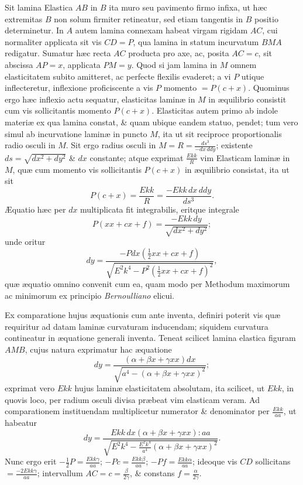 Sit lamina Elastica $AB$ in $B$ ita muro seu pavimento firmo infixa, ut hæc extremitas $B$ non solum firmiter retineatur, sed etiam tangentis in $B$ positio determinetur. In $A$ autem lamina connexam habeat virgam rigidam $AC$, cui normaliter applicata sit vis $CD=P$, qua lamina in statum incurvatum $BMA$ redigatur. Sumatur hæc recta $AC$ producta pro axe, ac, posita $AC=c$, sit abscissa $AP=x$, applicata $PM=y$. Quod si jam lamina in $M$ omnem elasticitatem subito amitteret, ac perfecte flexilis evaderet; a vi $P$ utique inflecteretur, inflexione proficiscente a vis $P$ momento $=P(c+x)$. Quominus ergo hæc inflexio actu sequatur, elasticitas laminæ in $M$ in æquilibrio consistit cum vis sollicitantis momento $P(c+x)$. Elasticitas autem primo ab indole materiæ ex qua lamina constat, \& quam ubique eandem statuo, pendet; tum vero simul ab incurvatione laminæ in puncto $M$, ita ut sit reciproce proportionalis radio osculi in $M$. Sit ergo radius osculi in $M=R=\frac{ds^3}{-dx\,ddy}$; existente $ds=\sqrt{dx^2+dy^2}$ \& $dx$ constante; atque exprimat $\frac{Ekk}{R}$ vim Elasticam laminæ in $M$, quæ cum momento vis sollicitantis $P(c+x)$ in æquilibrio consistat, ita ut sit
\[P(c+x)=\frac{Ekk}{R}=\frac{-Ekk\,dx\,ddy}{ds^3}.\]
Æquatio hæc
per $dx$ multiplicata fit integrabilis, eritque integrale
\[P(xx+cx+f)=\frac{-Ekk\,dy}{\sqrt{dx^2+dy^2}};\]
unde oritur
\[dy=\frac{-Pdx(\frac12xx+cx+f)}{\sqrt{E^2k^4-P^2(\frac12xx+cx+f)^2}},\]
quæ æquatio omnino convenit cum ea, quam modo per Methodum maximorum ac minimorum ex principio \textit{Bernoulliano} elicui.

Ex comparatione hujus æquationis cum ante inventa, definiri poterit vis quæ requiritur ad datam laminæ curvaturam inducendam; siquidem curvatura contineatur in æquatione generali inventa. Teneat scilicet lamina elastica figuram $AMB$, cujus natura exprimatur hac æquatione
\[dy=\frac{(\alpha+\beta x+\gamma xx)dx}{\sqrt{a^4-(\alpha+\beta x+\gamma xx)^2}};\]
exprimat vero $Ekk$ hujus laminæ elasticitatem absolutam, ita scilicet, ut $Ekk$, in quovis loco, per radium osculi divisa præbeat vim elasticam veram. Ad comparationem instituendam multiplicetur numerator \& denominator per $\frac{Ekk}{aa}$, ut habeatur
\[dy=\frac{Ekk\,dx(\alpha+\beta x+\gamma xx):aa}{\sqrt{E^2k^4-\frac{E^2k^4}{a^4}(\alpha+\beta x+\gamma xx)^2}}.\]
Nunc ergo erit $-\frac12P=\frac{Ekk\gamma}{aa}$; $-Pc=\frac{Ekk\beta}{aa}$; $-Pf=\frac{Ekk\alpha}{aa}$; ideoque vis $CD$ sollicitans $=\frac{-2Ekk\gamma}{aa}$; intervallum $AC=c=\frac\beta{2\gamma}$, \& constans $f=\frac\alpha{2\gamma}$.

